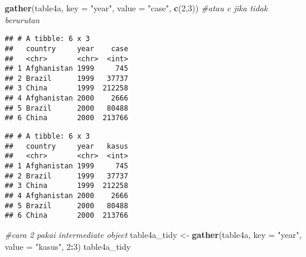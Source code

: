 \documentclass[]{article}
\newenvironment{Shaded}{\begin{snugshade}}{\end{snugshade}}
\newcommand{\CommentTok}[1]{\textcolor[rgb]{0.56,0.35,0.01}{\textit{#1}}}
\newcommand{\DataTypeTok}[1]{\textcolor[rgb]{0.13,0.29,0.53}{#1}}
\newcommand{\DecValTok}[1]{\textcolor[rgb]{0.00,0.00,0.81}{#1}}
\newcommand{\KeywordTok}[1]{\textcolor[rgb]{0.13,0.29,0.53}{\textbf{#1}}}
\newcommand{\NormalTok}[1]{#1}
\newcommand{\OperatorTok}[1]{\textcolor[rgb]{0.81,0.36,0.00}{\textbf{#1}}}
\newcommand{\StringTok}[1]{\textcolor[rgb]{0.31,0.60,0.02}{#1}}
\begin{document}
\begin{Shaded}
\begin{Highlighting}[]
\KeywordTok{gather}\NormalTok{(table4a, }\DataTypeTok{key =} \StringTok{"year"}\NormalTok{, }\DataTypeTok{value =} \StringTok{"case"}\NormalTok{, }\KeywordTok{c}\NormalTok{(}\DecValTok{2}\NormalTok{,}\DecValTok{3}\NormalTok{)) }\CommentTok{#atau c jika tidak berurutan}
\end{Highlighting}
\end{Shaded}

\begin{verbatim}
## # A tibble: 6 x 3
##   country     year    case
##   <chr>       <chr>  <int>
## 1 Afghanistan 1999     745
## 2 Brazil      1999   37737
## 3 China       1999  212258
## 4 Afghanistan 2000    2666
## 5 Brazil      2000   80488
## 6 China       2000  213766
\end{verbatim}

\begin{Shaded}
\end{Shaded}

\begin{verbatim}
## # A tibble: 6 x 3
##   country     year   kasus
##   <chr>       <chr>  <int>
## 1 Afghanistan 1999     745
## 2 Brazil      1999   37737
## 3 China       1999  212258
## 4 Afghanistan 2000    2666
## 5 Brazil      2000   80488
## 6 China       2000  213766
\end{verbatim}

\begin{Shaded}
\begin{Highlighting}[]
\CommentTok{#cara 2 pakai intermediate object}
\NormalTok{table4a_tidy <-}\StringTok{ }\KeywordTok{gather}\NormalTok{(table4a, }\DataTypeTok{key =} \StringTok{"year"}\NormalTok{, }\DataTypeTok{value =} \StringTok{"kasus"}\NormalTok{, }\DecValTok{2}\OperatorTok{:}\DecValTok{3}\NormalTok{) }
\NormalTok{table4a_tidy}
\end{Highlighting}
\end{Shaded}
\end{document}
